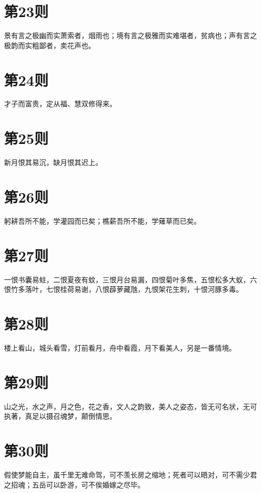 \documentclass[12pt,a4paper]{ctexbook}
\begin{document}
\section{第23则}
景有言之极幽而实萧索者，烟雨也；境有言之极雅而实难堪者，贫病也；声有言之极韵而实粗鄙者，卖花声也。\par

\section{第24则}
才子而富贵，定从福、慧双修得来。\par

\section{第25则}
新月恨其易沉，缺月恨其迟上。\par

\section{第26则}
躬耕吾所不能，学灌园而已矣；樵薪吾所不能，学薙草而已矣。\par

\section{第27则}
一恨书囊易蛀，二恨夏夜有蚊，三恨月台易漏，四恨菊叶多焦，五恨松多大蚁，六恨竹多落叶，七恨桂荷易谢，八恨薜萝藏虺，九恨架花生刺，十恨河豚多毒。\par

\section{第28则}
楼上看山，城头看雪，灯前看月，舟中看霞，月下看美人，另是一番情境。\par

\section{第29则}
山之光，水之声，月之色，花之香，文人之韵致，美人之姿态，皆无可名状，无可执著，真足以摄召魂梦，颠倒情思。\par

\section{第30则}
假使梦能自主，虽千里无难命驾，可不羡长房之缩地；死者可以晤对，可不需少君之招魂；五岳可以卧游，可不俟婚嫁之尽毕。\par
\end{document}
